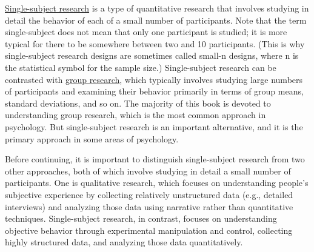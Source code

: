 \documentclass[
]{krantz}
\begin{document}
\protect\hyperlink{single-subject-research-1}{Single-subject research} is a type of quantitative research that involves studying in detail the behavior of each of a small number of participants. Note that the term single-subject does not mean that only one participant is studied; it is more typical for there to be somewhere between two and 10 participants. (This is why single-subject research designs are sometimes called small-n designs, where n is the statistical symbol for the sample size.) Single-subject research can be contrasted with \protect\hyperlink{group-research}{group research}, which typically involves studying large numbers of participants and examining their behavior primarily in terms of group means, standard deviations, and so on. The majority of this book is devoted to understanding group research, which is the most common approach in psychology. But single-subject research is an important alternative, and it is the primary approach in some areas of psychology.

Before continuing, it is important to distinguish single-subject research from two other approaches, both of which involve studying in detail a small number of participants. One is qualitative research, which focuses on understanding people's subjective experience by collecting relatively unstructured data (e.g., detailed interviews) and analyzing those data using narrative rather than quantitative techniques. Single-subject research, in contrast, focuses on understanding objective behavior through experimental manipulation and control, collecting highly structured data, and analyzing those data quantitatively.
\end{document}
